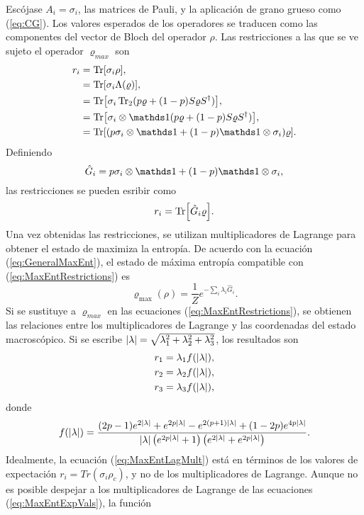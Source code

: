 Escójase ${A_{i}}={\sigma_{i}}$, las matrices de Pauli, y la aplicación de grano grueso como (\ref{eq:CG}). Los valores esperados de los operadores se traducen como las componentes del vector de Bloch del operador $\rho$. Las restricciones a las que se ve sujeto el operador $\varrho_{max}$ son
\begin{align*}
    r_{i}&=\Tr[\sigma_{i}\rho],\\
    &=\Tr[\sigma_{i}\Lambda(\varrho)],\\
    &=\Tr[\sigma_{i}\Tr_{2}(p\varrho+(1-p)S\varrho S^{\dag})],\\
    &=\Tr[\sigma_{i}\otimes\Id(p\varrho+(1-p)S\varrho S^{\dag})],\\
    &=\Tr[(p\sigma_{i}\otimes\Id+(1-p)\Id\otimes\sigma_{i})\varrho].
\end{align*}
Definiendo
\begin{equation}\label{eq:Ghat}
    \hat{G}_{i}=p\sigma_{i}\otimes\Id+(1-p)\Id\otimes\sigma_{i},
\end{equation}
las restricciones se pueden esribir como
\begin{equation}\label{eq:MaxEntRestrictions}
    r_{i}=\Tr[\hat{G}_{i}\varrho].
\end{equation}
Una vez obtenidas las restricciones, se utilizan multiplicadores de Lagrange para obtener el estado de maximiza la entropía. De acuerdo con la ecuación (\ref{eq:GeneralMaxEnt}), el estado de máxima entropía compatible con (\ref{eq:MaxEntRestrictions}) es
\begin{equation}\label{eq:MaxEntLagMult}
    \varrho_{\max}(\rho)=\frac{1}{Z}e^{-\sum_{i}\lambda_{i}\hat{G}_{i}}.
\end{equation}
Si se sustituye a $\varrho_{max}$ en las ecuaciones (\ref{eq:MaxEntRestrictions}), se obtienen las relaciones entre los multiplicadores de Lagrange y las coordenadas del estado macroscópico. Si se escribe $\abs{\lambda}=\sqrt{\lambda_{1}^{2}+\lambda_{2}^{2}+\lambda_{3}^{2}}$, los resultados son
\begin{align}
    \begin{split}\label{eq:MaxEntExpVals}
    r_{1}&=\lambda_{1}f(\abs{\lambda}),\\
    r_{2}&=\lambda_{2}f(\abs{\lambda}),\\
    r_{3}&=\lambda_{3}f(\abs{\lambda}),
    \end{split}
\end{align}
donde
\begin{equation*}
    f(\abs{\lambda})=\frac{(2 p-1) e^{2 \abs{\lambda}}+e^{2 p \abs{\lambda}}-e^{2 (p+1) \abs{\lambda}}+(1-2 p) e^{4 p \abs{\lambda}}}{\abs{\lambda}\left(e^{2 p \abs{\lambda}}+1\right) \left(e^{2 \abs{\lambda}}+e^{2 p \abs{\lambda}}\right)}.
\end{equation*}
Idealmente, la ecuación (\ref{eq:MaxEntLagMult}) está en términos de los valores de expectación $r_{i}=Tr(\sigma_{i}\rho_{c})$, y no de los multiplicadores de Lagrange. Aunque no es posible despejar a los multiplicadores de Lagrange de las ecuaciones (\ref{eq:MaxEntExpVals}), la función 